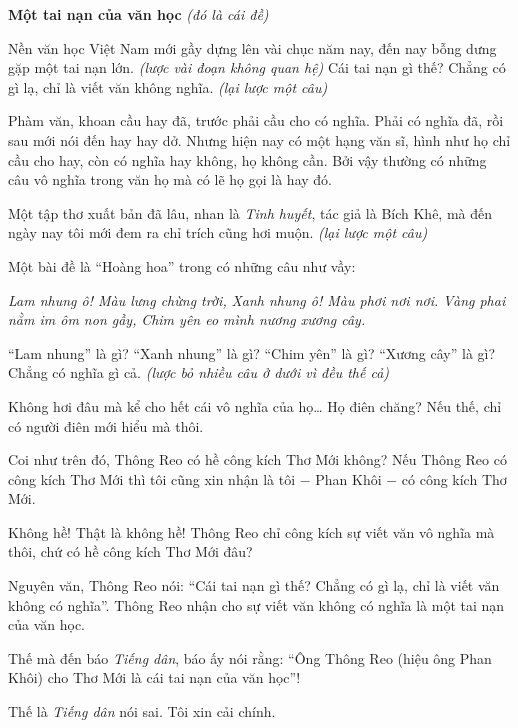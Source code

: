 \documentclass[../main.tex]{subfiles}
\begin{document}
\begin{multicols}{2}
\begin{blockquote}
		\textbf{Một tai nạn của văn học} 
		\textit{(đó là cái đề) } 
 
Nền văn học Việt Nam mới gầy dựng lên vài chục năm nay, đến nay bỗng dưng gặp một tai nạn lớn. \textit{(lược vài đoạn không quan hệ) }Cái tai nạn gì thế? Chẳng có gì lạ, chỉ là viết văn không nghĩa. \textit{(lại lược một câu) } 
 
Phàm văn, khoan cầu hay đã, trước phải cầu cho có nghĩa. Phải có nghĩa đã, rồi sau mới nói đến hay hay dở. Nhưng hiện nay có một hạng văn sĩ, hình như họ chỉ cầu cho hay, còn có nghĩa hay không, họ không cần. Bởi vậy thường có những câu vô nghĩa trong văn họ mà có lẽ họ gọi là hay đó.  
 
Một tập thơ xuất bản đã lâu, nhan là \textit{Tinh huyết}, tác giả là Bích Khê, mà đến ngày nay tôi mới đem ra chỉ trích cũng hơi muộn. \textit{(lại lược một câu)} 
 
Một bài đề là “Hoàng hoa” trong có những câu như vầy: 
	 
\textit{Lam nhung ô! Màu lưng chừng trời,} 
\textit{Xanh nhung ô! Màu phơi nơi nơi.} 
\textit{Vàng phai nằm im ôm non gầy,} 
\textit{Chim yên eo mình nương xương cây. } 
 
“Lam nhung” là gì? “Xanh nhung” là gì? “Chim yên” là gì? “Xương cây” là gì? Chẳng có nghĩa gì cả. \textit{(lược bỏ nhiều câu ở dưới vì đều thế cả)} 
 
Không hơi đâu mà kể cho hết cái vô nghĩa của họ… Họ điên chăng? Nếu thế, chỉ có người điên mới hiểu mà thôi. 

\end{blockquote}
 
Coi như trên đó, Thông Reo có hề công kích Thơ Mới không? Nếu Thông Reo có công kích Thơ Mới thì tôi cũng xin nhận là tôi − Phan Khôi − có công kích Thơ Mới. 
 
Không hề! Thật là không hề! Thông Reo chỉ công kích sự viết văn vô nghĩa mà thôi, chứ có hề công kích Thơ Mới đâu? 
 
Nguyên văn, Thông Reo nói: “Cái tai nạn gì thế? Chẳng có gì lạ, chỉ là viết văn không có nghĩa”. Thông Reo nhận cho sự viết văn không có nghĩa là một tai nạn của văn học. 
 
Thế mà đến báo \textit{Tiếng dân}, báo ấy nói rằng: “Ông Thông Reo (hiệu ông Phan Khôi) cho Thơ Mới là cái tai nạn của văn học”! 
 
Thế là \textit{Tiếng dân} nói sai. Tôi xin cải chính. 
 



\end{multicols}
\end{document}
